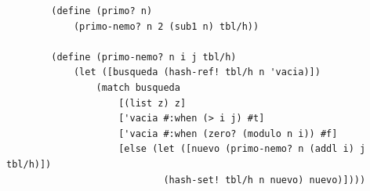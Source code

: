 \documentclass[letterpaper,11pt]{article}
\begin{document}
\begin{enumerate}
\begin{verbatim}
        (define (primo? n)
            (primo-nemo? n 2 (sub1 n) tbl/h))
            
        (define (primo-nemo? n i j tbl/h)
            (let ([busqueda (hash-ref! tbl/h n 'vacia)])
                (match busqueda
                    [(list z) z]
                    ['vacia #:when (> i j) #t]
                    ['vacia #:when (zero? (modulo n i)) #f]
                    [else (let ([nuevo (primo-nemo? n (addl i) j tbl/h)]) 
                            (hash-set! tbl/h n nuevo) nuevo)])))
    \end{verbatim}
\end{enumerate}
\end{document}
